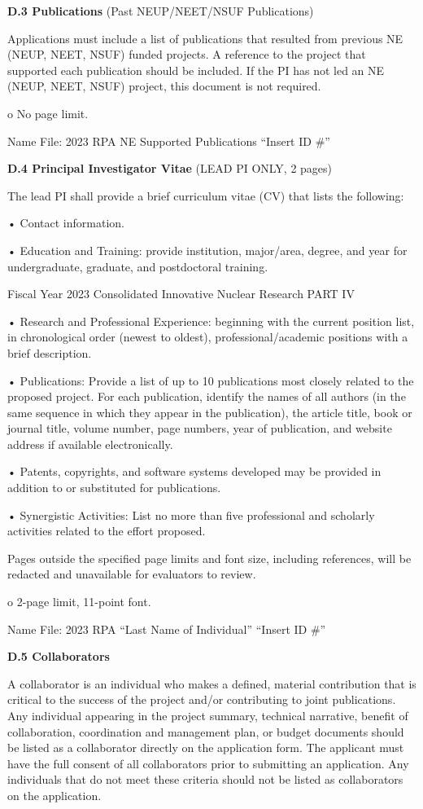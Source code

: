 {\bf D.3 Publications} (Past NEUP/NEET/NSUF Publications)

Applications must include a list of publications that resulted from previous NE
(NEUP, NEET, NSUF) funded projects. A reference to the project that supported
each publication should be included. If the PI has not led an NE (NEUP, NEET,
NSUF) project, this document is not required.

o No page limit.

Name File: 2023 RPA NE Supported Publications “Insert ID \#”

{\bf D.4 Principal Investigator Vitae} (LEAD PI ONLY, 2 pages)

The lead PI shall provide a brief curriculum vitae (CV) that lists the
following:

• Contact information.

• Education and Training: provide institution, major/area, degree, and year for
undergraduate, graduate, and postdoctoral training.

Fiscal Year 2023 Consolidated Innovative Nuclear Research PART IV

• Research and Professional Experience: beginning with the current position
list, in chronological order (newest to oldest), professional/academic
positions with a brief description.

• Publications: Provide a list of up to 10 publications most closely related to
the proposed project. For each publication, identify the names of all authors
(in the same sequence in which they appear in the publication), the article
title, book or journal title, volume number, page numbers, year of publication,
and website address if available electronically.

• Patents, copyrights, and software systems developed may be provided in
addition to or substituted for publications.

• Synergistic Activities: List no more than five professional and scholarly
activities related to the effort proposed.

Pages outside the specified page limits and font size, including references,
will be redacted and unavailable for evaluators to review.

o 2-page limit, 11-point font.

Name File: 2023 RPA “Last Name of Individual” “Insert ID \#”

{\bf D.5 Collaborators}

A collaborator is an individual who makes a defined, material contribution that
is critical to the success of the project and/or contributing to joint
publications. Any individual appearing in the project summary, technical
narrative, benefit of collaboration, coordination and management plan, or
budget documents should be listed as a collaborator directly on the application
form. The applicant must have the full consent of all collaborators prior to
submitting an application. Any individuals that do not meet these criteria
should not be listed as collaborators on the application.


